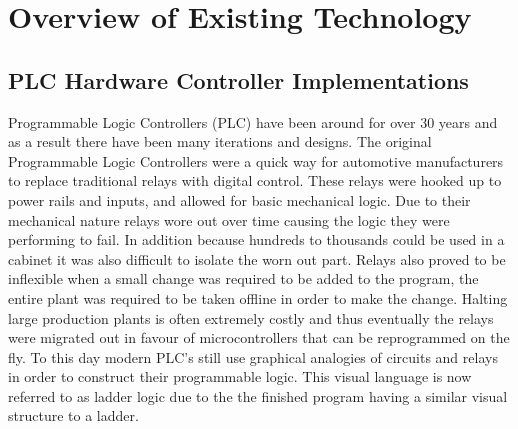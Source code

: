 
\chapter{Overview of Existing Technology}
\section{PLC Hardware Controller Implementations}
Programmable Logic Controllers (PLC) have been around for over 30 years and as a result there have been many iterations and designs. The original Programmable Logic Controllers were a quick way for automotive manufacturers to replace traditional relays with digital control. These relays were hooked up to power rails and inputs, and allowed for basic mechanical logic. Due to their mechanical nature relays wore out over time causing the logic they were performing to fail. In addition because hundreds to thousands could be used in a cabinet it was also difficult to isolate the worn out part. Relays also proved to be inflexible when a small change was required to be added to the program, the entire plant was required to be taken offline in order to make the change. Halting large production plants is often extremely costly and thus eventually the relays were migrated out in favour of microcontrollers that can be reprogrammed on the fly. To this day modern PLC's still use graphical analogies of circuits and relays in order to construct their programmable logic. This visual language is now referred to as ladder logic due to the the finished program having a similar visual structure to a ladder. 

